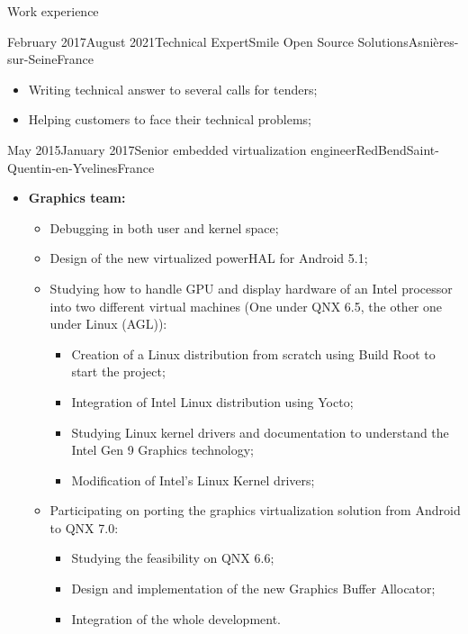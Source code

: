 \documentclass[a4paper, 10pt]{article}
\begin{document}
\begin{section} {Work experience}
\begin{experience}{February 2017}{August 2021}{Technical Expert}{Smile Open Source Solutions}{Asni\`{e}res-sur-Seine}{France}
\begin{subexperience}
\begin{itemize}[parsep=0cm,itemsep=0cm,topsep=0cm]
\begin{itemize}[parsep=0cm,itemsep=0cm,topsep=0cm]
			\item Writing technical answer to several calls for tenders;
			\item Helping customers to face their technical problems;
		\end{itemize}
	\end{itemize}
	\end{subexperience}
	\end{experience}

    \begin{experience}{May 2015}{January 2017}{Senior embedded virtualization engineer}{RedBend}{Saint-Quentin-en-Yvelines}{France}
	\begin{subexperience}
	    \begin{itemize}[parsep=0cm,itemsep=0cm,topsep=0cm]
		\item \textbf {Graphics team:}
		\begin{itemize}[parsep=0cm,itemsep=0cm,topsep=0cm]
		    \item Debugging in both user and kernel space;
		    \item Design of the new virtualized powerHAL for Android 5.1;
		    \item Studying how to handle GPU and display hardware of an Intel processor into two different virtual machines (One under QNX 6.5, the other one under Linux (AGL)):
		    \begin{itemize}[parsep=0cm,itemsep=0cm,topsep=0cm]
			\item Creation of a Linux distribution from scratch using Build Root to start the project;
			\item Integration of Intel Linux distribution using Yocto;
			\item Studying Linux kernel drivers and documentation to understand the Intel Gen 9 Graphics technology;
			\item Modification of Intel's Linux Kernel drivers;
		    \end{itemize}
		    \item Participating on porting the graphics virtualization solution from Android to QNX 7.0:
		    \begin{itemize}[parsep=0cm,itemsep=0cm,topsep=0cm]
			\item Studying the feasibility on QNX 6.6;
			\item Design and implementation of the new Graphics Buffer Allocator;
			\item Integration of the whole development.
		    \end{itemize}
		\end{itemize}
	    \end{itemize}
	\end{subexperience}
    \end{experience}


\end{section}
\end{document}
